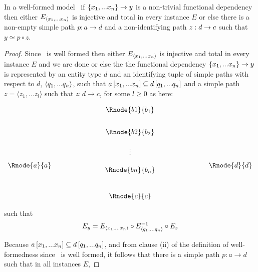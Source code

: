 \begin{lemma}
\label{mainlemma}
In a well-formed model \genericmodel\ if $\{x_1,...x_n\} \rightarrow y$  is a non-trivial
functional dependency then either $E_{\langle x_1,...x_n\rangle}$ is injective and total in every instance $E$ 
or else there is a non-empty  simple path $p:a \rightarrow d$
and a non-identifying path $z:d \rightarrow c$ such that $y \simeq p \circ z$.
\end{lemma}
\begin{proof}
Since \genericmodel\ is well formed then either $E_{\langle x_1,...x_n\rangle}$ is injective and total in every instance $E$ and we are done or else the
the functional dependency
$\{x_1,...x_n\} \rightarrow y$   is represented 
by  an entity type $d$ and 
an identifying tuple of simple paths with respect to
$d$, $\langle q_1,...q_n\rangle$, such that $a\left[x_1,...x_n\right]\subseteq d\left[q_1,...q_n\right]$ and a simple
path $z=\langle z_1,...z_l \rangle$ such that $z:d\rightarrow c$, for some $l \geq 0$ as here:

\setlength{\arraycolsep}{.2cm}
\begin{center}

$
\begin{array}{cp{2cm}c p{2cm} c}
             &  & \Rnode{b1}{b_1} & &               \\ [0.7cm]
						 &  & \Rnode{b2}{b_2} & &               \\ [0.4cm]
						 &  &     \vdots      & &               \\ [0.2cm]
\Rnode{a}{a} &  &                 & & \Rnode{d}{d}  \\ [-0.2cm]
             &  & \Rnode{bn}{b_n} & &               \\ [0.9cm]
             &  & \Rnode{c}{c}    & &               \\
\end{array}
$
\end{center}
such that
\begin{equation}
\label{fundependency}
E_y = E_{\langle x_1,...x_n\rangle} \circ E_{\langle q_1,...q_n\rangle}^{-1} \circ E_z
\end{equation}

Because $a\left[x_1,...x_n\right]\subseteq d\left[q_1,...q_n\right]$,  and from
clause (ii) of the definition of well-formedness since \genericmodel\ is well formed, it follows that
there  is a simple path $p:a \rightarrow d$ such
that 
in all instances $E$,


\end{proof}
